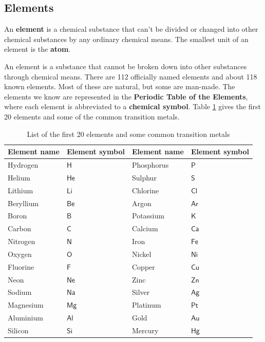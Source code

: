             \subsection*{Elements}
            \nopagebreak
        \label{m38708*id63302}An \textbf{element} is a chemical substance that can't be divided or changed into other chemical substances by any ordinary chemical means. The smallest unit of an element is the \textbf{atom}.\par 
\label{m38708*fhsst!!!underscore!!!id193}
{ \label{m38708*meaningfhsst!!!underscore!!!id193}
An element is a substance that cannot be broken down into other substances through chemical means.} 
        \label{m38708*id63334}There are 112 officially named elements and about 118 known elements. Most of these are natural, but some are man-made. The elements we know are represented in the \textbf{Periodic Table of the Elements}, where each element is abbreviated to a \textbf{chemical symbol}. Table \ref{tab:elements} gives the first 20 elements and some of the common transition metals.\par \label{m38708*eip-775}
\begin{table}[h!]
\label{tab:elements}
\begin{center}
\begin{tabular}{|l|l|l|l|}\hline
\textbf{Element name} & \textbf{Element symbol} & \textbf{Element name} & \textbf{Element symbol} \\ \hline
Hydrogen & $\mathsf{H}$ & Phosphorus & $\mathsf{P}$  \\ \hline
Helium & $\mathsf{He}$ & Sulphur & $\mathsf{S}$ \\ \hline
Lithium & $\mathsf{Li}$ & Chlorine & $\mathsf{Cl}$ \\ \hline
Beryllium & $\mathsf{Be}$ & Argon & $\mathsf{Ar}$ \\ \hline 
Boron & $\mathsf{B}$ & Potassium & $\mathsf{K}$ \\ \hline
Carbon & $\mathsf{C}$ & Calcium & $\mathsf{Ca}$ \\ \hline 
Nitrogen & $\mathsf{N}$ & Iron & $\mathsf{Fe}$ \\ \hline
Oxygen & $\mathsf{O}$ & Nickel & $\mathsf{Ni}$ \\ \hline 
Fluorine & $\mathsf{F}$ & Copper & $\mathsf{Cu}$ \\ \hline
Neon & $\mathsf{Ne}$  & Zinc & $\mathsf{Zn}$ \\ \hline
Sodium & $\mathsf{Na}$  & Silver & $\mathsf{Ag}$ \\ \hline
Magnesium & $\mathsf{Mg}$  & Platinum & $\mathsf{Pt}$ \\ \hline
Aluminium & $\mathsf{Al}$ & Gold & $\mathsf{Au}$ \\ \hline
Silicon & $\mathsf{Si}$ & Mercury & $\mathsf{Hg}$  \\ \hline
\end{tabular}
\end{center}
\caption{List of the first 20 elements and some common transition metals}
\end{table}
